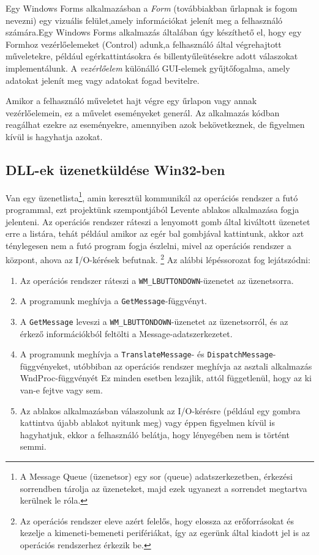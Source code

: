 \documentclass[tocnopagenum]{thesis-ekf}
\theoremstyle{definition}
\theoremstyle{remark}
\begin{document}
	Egy Windows Forms alkalmazásban a \textit{Form} (továbbiakban űrlapnak is fogom nevezni) egy vizuális felület,amely információkat jelenít meg a felhasználó számára.Egy Windows Forms alkalmazás általában úgy készíthető el, hogy egy Formhoz vezérlőelemeket (Control) adunk,a felhasználó által végrehajtott műveletekre, például egérkattintásokra és billentyűleütésekre adott válaszokat implementálunk. A \textit{vezérlőelem} különálló GUI-elemek gyűjtőfogalma, amely adatokat jelenít meg vagy adatokat fogad bevitelre.
	
	Amikor a felhasználó műveletet hajt végre egy űrlapon vagy annak vezérlőelemein, ez a művelet eseményeket generál. Az alkalmazás kódban reagálhat ezekre az eseményekre, amennyiben azok bekövetkeznek, de figyelmen kívül is hagyhatja azokat.\cite{winform}
	\subsection{DLL-ek üzenetküldése Win32-ben}
	Van egy üzenetlista\footnote{A Message Queue (üzenetsor) egy sor (queue) adatszerkezetben, érkezési sorrendben tárolja az üzeneteket, majd ezek ugyanezt a sorrendet megtartva kerülnek le róla.}, amin keresztül kommunikál az operációs rendszer a futó programmal, ezt projektünk szempontjából Levente ablakos alkalmazása fogja jelenteni. Az operációs rendszer ráteszi a lenyomott gomb által kiváltott üzenetet erre a listára, tehát például amikor az egér bal gombjával kattintunk,	akkor azt ténylegesen nem a futó program fogja észlelni, mivel az operációs rendszer a központ, ahova az I/O-kérések befutnak. \footnote{Az operációs rendszer eleve azért felelős, hogy elossza az erőforrásokat és kezelje a kimeneti-bemeneti perifériákat, így az egerünk által kiadott jel is az operációs rendszerhez érkezik be.}
	Az alábbi lépéssorozat fog lejátszódni:
	\begin{enumerate}
		\item Az operációs rendszer ráteszi a \verb*|WM_LBUTTONDOWN|-üzenetet az üzenetsorra.
		\item A programunk meghívja a \verb*|GetMessage|-függvényt.
		\item A \verb*|GetMessage| leveszi a \verb*|WM_LBUTTONDOWN|-üzenetet az üzenetsorról, és az érkező információkból feltölti a Message-adatszerkezetet.
		\item A programunk meghívja a \verb*|TranslateMessage|- és \verb*|DispatchMessage|-függvényeket, utóbbiban az operációs rendszer meghívja az asztali alkalmazás WndProc-függvényét Ez minden esetben lezajlik, attól függetlenül, hogy az ki van-e fejtve vagy sem.
		\item Az ablakos alkalmazásban válaszolunk az I/O-kérésre (például egy gombra kattintva újabb ablakot nyitunk meg) vagy éppen figyelmen kívül is hagyhatjuk, ekkor a felhasználó belátja, hogy lényegében nem is történt semmi.
	\end{enumerate}
\end{document}
